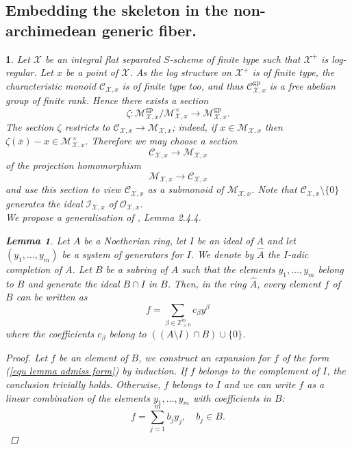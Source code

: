 \documentclass{amsart}%
\numberwithin{equation}{subsection}
\theoremstyle{plain2}
\newtheorem{lemma}[equation]{Lemma}
\theoremstyle{definition2}
\theoremstyle{stepstyle}
\theoremstyle{point}
\theoremstyle{subpoint}
\newtheorem{subpoint}[equation]{}%
\newcommand{\spa}[1]{\begin{subpoint}#1\end{subpoint}}           %
\newcommand{\Z}{\ensuremath{\mathbb{Z}}}
\newcommand{\cX}{\ensuremath{\mathscr{X}}}
\newcommand{\caM}{\ensuremath{\mathcal{M}}}
\newcommand{\caC}{\ensuremath{\mathcal{C}}}
\newcommand{\caI}{\ensuremath{\mathcal{I}}}
\newcommand{\gp}{\mathrm{gp}}
\begin{document}
\subsection{Embedding the skeleton in the non-archimedean generic fiber.}
\spa{Let $\cX$ be an integral flat separated $S$-scheme of finite type such that $\cX^+$ is log-regular. Let $x$ be a point of $\cX$. As the log structure on $\cX^+$ is of finite type, the characteristic monoid $\caC_{\cX,x}$ is of finite type too, and thus $\caC_{\cX,x}^\gp$ is a free abelian group of finite rank. Hence there exists a section $$\zeta: \caM_{\cX,x}^\gp / \caM_{\cX,x}^\times \rightarrow \caM_{\cX,x}^\gp.$$ The section $\zeta$ restricts to $\caC_{\cX,x} \rightarrow \caM_{\cX,x}$; indeed, if $x \in \caM_{\cX,x}$ then $\zeta(\overline{x})-x \in \caM_{\cX,x}^\times$. Therefore we may choose a section \begin{equation}\label{eq:sect}\mathcal{C}_{\cX,x}\to
\mathcal{M}_{\cX,x}\end{equation} of the projection homomorphism
$$\mathcal{M}_{\cX,x}\to \mathcal{C}_{\cX,x}$$ and use this section to view $\mathcal{C}_{\cX,x}$ as a submonoid of $\mathcal{M}_{\cX,x}$. Note that $\mathcal{C}_{\cX,x}\setminus \{0\}$ generates the ideal $\caI_{\cX,x}$ of $\mathcal{O}_{\cX,x}$.
\\

We propose a generalisation of \cite{MustataNicaise}, Lemma 2.4.4. \begin{lemma} \label{lemma admissible expansion} Let $A$ be a Noetherian ring, let $I$ be an ideal of $A$ and let $(y_1,\ldots,y_m)$ be a system of generators for $I$. We denote by $\hat{A}$ the $I$-adic completion of $A$. Let $B$ be a subring of $A$ such that the elements $y_1,\ldots,y_m$ belong to $B$ and generate the ideal $B \cap I$ in $B$. Then, in the ring $\hat{A}$, every element $f$ of $B$ can be written as \begin{equation} \label{equ lemma admiss form}
f=\sum_{\beta \in \Z^m_{\geqslant 0}} c_\beta y^\beta
\end{equation} where the coefficients $c_\beta$ belong to $((A\setminus I) \cap B) \cup \{0\}$.
\end{lemma} 
\begin{proof}
Let $f$ be an element of $B$, we construct an expansion for $f$ of the form (\ref{equ lemma admiss form}) by induction. If $f$ belongs to the complement of $I$, the conclusion trivially holds. Otherwise, $f$ belongs to $I$ and we can write $f$ as a linear combination of the elements $y_1,\ldots,y_m$ with coefficients in $B$: $$f= \sum_{j=1}^{m} b_j y_j, \quad b_j \in B.$$


\end{proof}}
\end{document}
